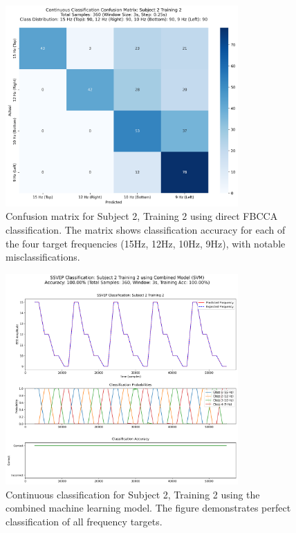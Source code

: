 \documentclass[conference]{IEEEtran}
\begin{document}
\begin{figure}[!t]
\centering
\includegraphics[width=3.5in]{images/continuous_confusion_matrix_subject_2_training_2.png}
\caption{Confusion matrix for Subject 2, Training 2 using direct FBCCA classification. The matrix shows classification accuracy for each of the four target frequencies (15Hz, 12Hz, 10Hz, 9Hz), with notable misclassifications.}
\label{fig:sub2_confmat}
\end{figure}

\begin{figure}[!t]
\centering
\includegraphics[width=3.5in]{images/combined_prediction_subject_2_training_2.png}
\caption{Continuous classification for Subject 2, Training 2 using the combined machine learning model. The figure demonstrates perfect classification of all frequency targets.}
\label{fig:sub2_ml}
\end{figure}
\end{document}
